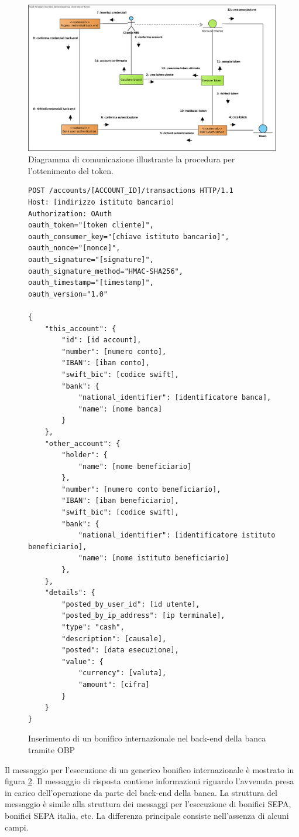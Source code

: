 \begin{figure}[h]
    \centering
	\includegraphics[width=\textwidth]{Images/Ottenimento_Token.eps}
    \caption{Diagramma di comunicazione illustrante la procedura per l'ottenimento del token.}
    \label{fig:oauth:token}
\end{figure}

\begin{figure}[h]
\begin{lstlisting}[basicstyle=\ttfamily]
POST /accounts/[ACCOUNT_ID]/transactions HTTP/1.1
Host: [indirizzo istituto bancario]
Authorization: OAuth
oauth_token="[token cliente]",
oauth_consumer_key="[chiave istituto bancario]",
oauth_nonce="[nonce]",
oauth_signature="[signature]",
oauth_signature_method="HMAC-SHA256",
oauth_timestamp="[timestamp]",
oauth_version="1.0"

{
    "this_account": {
        "id": [id account],
        "number": [numero conto],
        "IBAN": [iban conto],
        "swift_bic": [codice swift],
        "bank": {
            "national_identifier": [identificatore banca],
            "name": [nome banca]
        }
    },
    "other_account": {
        "holder": {
            "name": [nome beneficiario]
        },
        "number": [numero conto beneficiario],
        "IBAN": [iban beneficiario],
        "swift_bic": [codice swift],
        "bank": {
            "national_identifier": [identificatore istituto beneficiario],
            "name": [nome istituto beneficiario]
        },
    },
    "details": {
        "posted_by_user_id": [id utente],
        "posted_by_ip_address": [ip terminale],
        "type": "cash",
        "description": [causale],
        "posted": [data esecuzione],
        "value": {
            "currency": [valuta],
            "amount": [cifra]
        }
    }
}
\end{lstlisting}
	\caption{\label{fig:operazioni:bonifico-internazionale:json}Inserimento di un bonifico internazionale nel back-end della banca tramite OBP}
\end{figure}

Il messaggio per l'esecuzione di un generico bonifico internazionale \`e mostrato in figura \ref{fig:operazioni:bonifico-internazionale:json}.
Il messaggio di risposta contiene informazioni riguardo l'avvenuta presa in carico dell'operazione da parte del back-end della banca.
La struttura del messaggio \`e simile alla struttura dei messaggi per l'esecuzione di bonifici SEPA, bonifici SEPA italia, etc.
La differenza principale consiste nell'assenza di alcuni campi.

